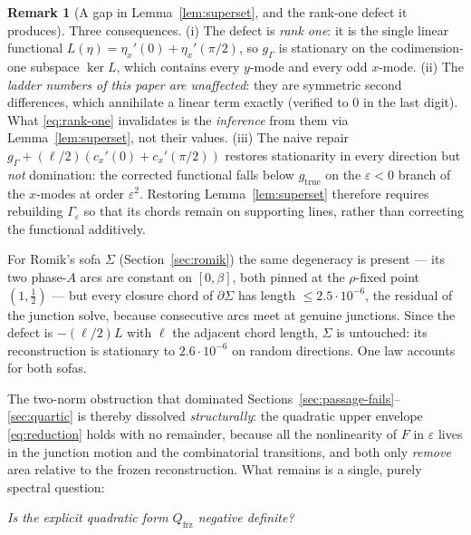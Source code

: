 \documentclass[11pt]{amsart}
\theoremstyle{plain}
\theoremstyle{definition}
\newtheorem{remark}[theorem]{Remark}
\begin{document}
\begin{remark}[A gap in Lemma~\ref{lem:superset}, and the rank-one defect it
produces]
Three consequences.  (i) The defect is \emph{rank one}: it is the
single linear functional $L(\eta)=\eta_{x}'(0)+\eta_{x}'(\pi/2)$, so
$g_{\Gamma}$ is stationary on the codimension-one subspace $\ker L$,
which contains every $y$-mode and every odd $x$-mode.  (ii) The
\emph{ladder numbers of this paper are unaffected}: they are symmetric
second differences, which annihilate a linear term exactly (verified
to $0$ in the last digit).  What \eqref{eq:rank-one} invalidates is the
\emph{inference} from them via Lemma~\ref{lem:superset}, not their
values.  (iii) The naive repair
$g_{\Gamma}+(\ell/2)(c_{x}'(0)+c_{x}'(\pi/2))$ restores stationarity
in every direction but \emph{not} domination: the corrected functional
falls below $g_{\mathrm{true}}$ on the $\varepsilon<0$ branch of the
$x$-modes at order $\varepsilon^{2}$.  Restoring
Lemma~\ref{lem:superset} therefore requires rebuilding
$\Gamma_{\varepsilon}$ so that its chords remain on supporting lines,
rather than correcting the functional additively.

For Romik's sofa $\Sigma$ (Section~\ref{sec:romik}) the same
degeneracy is present --- its two phase-$A$ arcs are constant on
$[0,\beta]$, both pinned at the $\rho$-fixed point $(1,\tfrac12)$ ---
but every closure chord of $\partial\Sigma$ has length
$\leq2.5\cdot10^{-6}$, the residual of the junction solve, because
consecutive arcs meet at genuine junctions.  Since the defect is
$-(\ell/2)L$ with $\ell$ the adjacent chord length, $\Sigma$ is
untouched: its reconstruction is stationary to $2.6\cdot10^{-6}$ on
random directions.  One law accounts for both sofas.
\end{remark}


The two-norm obstruction that dominated
Sections~\ref{sec:passage-fails}--\ref{sec:quartic} is thereby
dissolved \emph{structurally}: the quadratic upper envelope
\eqref{eq:reduction} holds with no remainder, because all the
nonlinearity of $F$ in $\varepsilon$ lives in the junction motion and
the combinatorial transitions, and both only \emph{remove} area
relative to the frozen reconstruction.  What remains is a single,
purely spectral question:

\begin{center}
\emph{Is the explicit quadratic form $Q_{\mathrm{frz}}$ negative
definite?}
\end{center}
\end{document}
